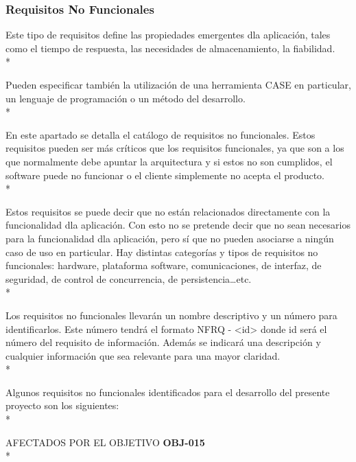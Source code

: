 \documentclass[../pfc.tex]{subfiles}
\begin{document}
	












	\subsubsection{Requisitos No Funcionales}
	
	Este tipo de requisitos define las propiedades emergentes dla aplicación, tales como el tiempo de
	respuesta, las necesidades de almacenamiento, la fiabilidad.\\*
	
	Pueden especificar también la utilización de una herramienta CASE en particular, un lenguaje
	de programación o un método del desarrollo.\\*
	
	En este apartado se detalla el catálogo de requisitos no funcionales. Estos requisitos pueden
	ser más críticos que los requisitos funcionales, ya que son a los que normalmente debe apuntar la
	arquitectura y si estos no son cumplidos, el software puede no funcionar o el cliente simplemente
	no acepta el producto.\\*
	
	Estos requisitos se puede decir que no están relacionados directamente con la funcionalidad
	dla aplicación. Con esto no se pretende decir que no sean necesarios para la funcionalidad dla aplicación,
	pero sí que no pueden asociarse a ningún caso de uso en particular. Hay distintas categorías y tipos
	de requisitos no funcionales: hardware, plataforma software, comunicaciones, de interfaz, de
	seguridad, de control de concurrencia, de persistencia…etc.\\*
	
	Los requisitos no funcionales llevarán un nombre descriptivo y un número para identificarlos.
	Este número tendrá el formato NFRQ - <id> donde id será el número del requisito de información.
	Además se indicará una descripción y cualquier información que sea relevante para una mayor
	claridad.\\*
	
	Algunos requisitos no funcionales identificados para el desarrollo del presente proyecto son
	los siguientes:\\*

	AFECTADOS POR EL OBJETIVO 	\textbf{OBJ-015}\\*
		
\end{document}
